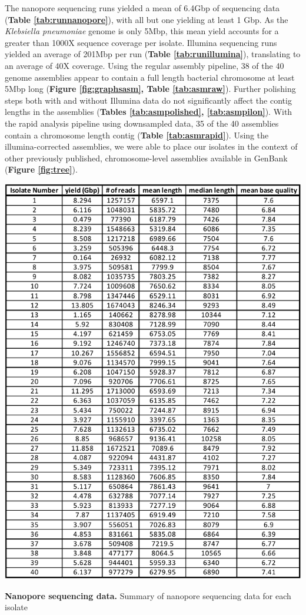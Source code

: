 The nanopore sequencing runs yielded a mean of 6.4Gbp of sequencing data ({\bf Table \ref{tab:runnanopore}}), with all but one yielding at least 1 Gbp. As the \textit{Klebsiella pneumoniae} genome is only 5Mbp, this mean yield accounts for a greater than 1000X sequence coverage per isolate. Illumina sequencing runs yielded an average of 201Mbp per run ({\bf Table \ref{tab:runillumina}}), translating to an average of 40X coverage. Using the regular assembly pipeline, 38 of the 40 genome assemblies appear to contain a full length bacterial chromosome at least 5Mbp long ({\bf Figure \ref{fig:graphsasm}, Table \ref{tab:asmraw}}). Further polishing steps both with and without Illumina data do not significantly affect the contig lengths in the assemblies ({\bf Tables \ref{tab:asmpolished}, \ref{tab:asmpilon}}). With the rapid analysis pipeline using downsampled data, 35 of the 40 assemblies contain a chromosome length contig ({\bf Table \ref{tab:asmrapid}}). Using the illumina-corrected assemblies, we were able to place our isolates in the context of other previously published, chromosome-level assemblies available in GenBank ({\bf Figure \ref{fig:tree}}).

\begin{table}[!ht]
\centering
\includegraphics[width = .7\linewidth,keepaspectratio]{figure/runnanopore.pdf}
\caption[Nanopore sequencing data]{{\bf Nanopore sequencing data.} Summary of nanopore sequencing data for each isolate }
\label{tab:runnanopore}
\end{table}


